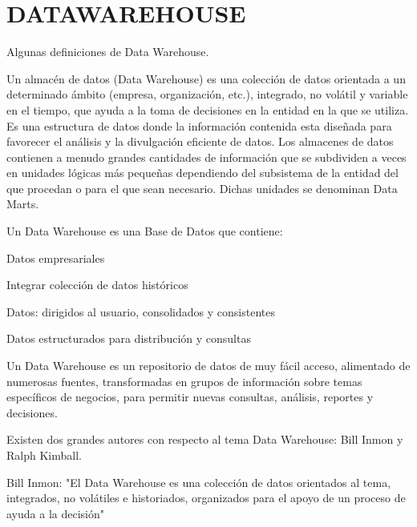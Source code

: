 \section{DATAWAREHOUSE}
\item{Algunas definiciones de Data Warehouse.

Un almacén de datos (Data Warehouse) es una colección de datos orientada a un determinado ámbito (empresa, organización, etc.), integrado, no volátil y variable en el tiempo, que ayuda a la toma de decisiones en la entidad en la que se utiliza. Es una estructura de datos donde la información contenida esta diseñada para favorecer el análisis y la divulgación eficiente de datos. Los almacenes de datos contienen a menudo grandes cantidades de información que se subdividen a veces en unidades lógicas más pequeñas dependiendo del subsistema de la entidad del que procedan o para el que sean necesario. Dichas unidades se denominan Data Marts.

Un Data Warehouse es una Base de Datos que contiene:

Datos empresariales

Integrar colección de datos históricos

Datos: dirigidos al usuario, consolidados y consistentes

Datos estructurados para distribución y consultas

Un Data Warehouse es un repositorio de datos de muy fácil acceso, alimentado de numerosas fuentes, transformadas en grupos de información sobre temas específicos de negocios, para permitir nuevas consultas, análisis, reportes y decisiones.

Existen dos grandes autores con respecto al tema Data Warehouse: Bill Inmon y Ralph Kimball.

Bill Inmon: "El Data Warehouse es una colección de datos orientados al tema, integrados, no volátiles e historiados, organizados para el apoyo de un proceso de ayuda a la decisión"

}
